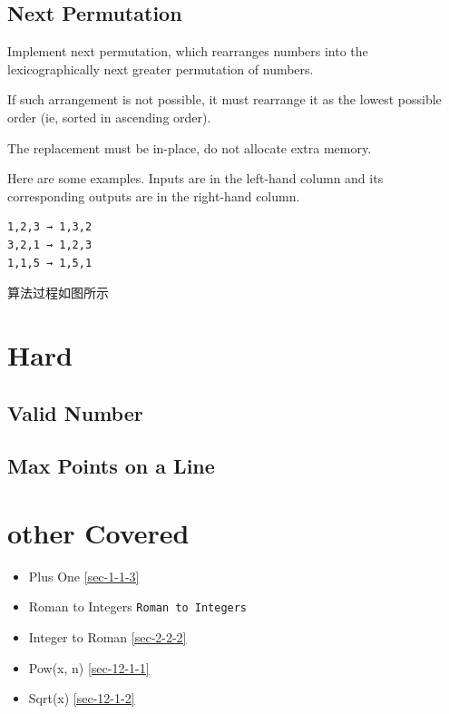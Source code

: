 \documentclass[12pt]{book}
\begin{document}
\subsection{Next Permutation}
\label{sec-21-2-5}
Implement next permutation, which rearranges numbers into the lexicographically next greater permutation of numbers.

If such arrangement is not possible, it must rearrange it as the lowest possible order (ie, sorted in ascending order).

The replacement must be in-place, do not allocate extra memory.

Here are some examples. Inputs are in the left-hand column and its
corresponding outputs are in the right-hand column.
\lstset{language=java,label= ,caption= ,numbers=none}
\begin{lstlisting}
1,2,3 → 1,3,2
3,2,1 → 1,2,3
1,1,5 → 1,5,1
\end{lstlisting}

算法过程如图所示

\section{Hard}
\label{sec-21-3}
\subsection{Valid Number}
\label{sec-21-3-1}
\subsection{Max Points on a Line}
\label{sec-21-3-2}
\section{other Covered}
\label{sec-21-4}
\begin{itemize}
\item Plus One
\ref{sec-1-1-3}
\item Roman to Integers
\texttt{Roman to Integers}
\item Integer to Roman
\ref{sec-2-2-2}
\item Pow(x, n)
\ref{sec-12-1-1}
\item Sqrt(x)
\ref{sec-12-1-2}
\end{itemize}
\end{document}
